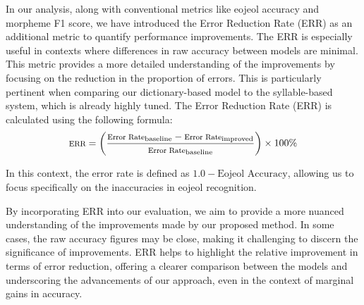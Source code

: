 \documentclass[AMS,STIX2COL]{WileyNJD-v2}
\begin{document}
    In our analysis, along with conventional metrics like eojeol accuracy and morpheme F1 score, we have introduced the Error Reduction Rate (ERR) as an additional metric to quantify performance improvements.
    The ERR is especially useful in contexts where differences in raw accuracy between models are minimal.
    This metric provides a more detailed understanding of the improvements by focusing on the reduction in the proportion of errors.
    This is particularly pertinent when comparing our dictionary-based model to the syllable-based system, which is already highly tuned.
    The Error Reduction Rate (ERR) is calculated using the following formula:
    \vspace{1mm}
    \[
        \footnotesize
        \text{ERR} = \left( \frac{\text{Error Rate}_{\text{baseline}} - \text{Error Rate}_{\text{improved}}}{\text{Error Rate}_{\text{baseline}}} \right) \times 100\%
    \]
    \vspace{0.5mm}

    In this context, the error rate is defined as \(1.0 - \text{Eojeol Accuracy}\), allowing us to focus specifically on the inaccuracies in eojeol recognition.

    By incorporating ERR into our evaluation, we aim to provide a more nuanced understanding of the improvements made by our proposed method.
    In some cases, the raw accuracy figures may be close, making it challenging to discern the significance of improvements.
    ERR helps to highlight the relative improvement in terms of error reduction, offering a clearer comparison between the models and underscoring the advancements of our approach, even in the context of marginal gains in accuracy.
\end{document}
